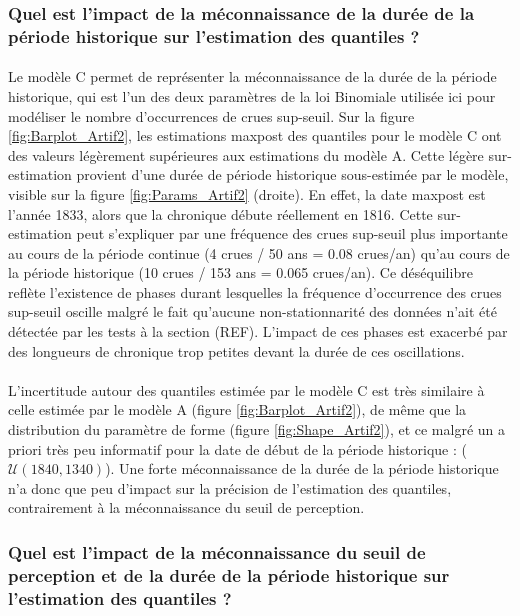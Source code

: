 \documentclass[11pt]{article}
\begin{document}
	\subsubsection{Quel est l'impact de la méconnaissance de la durée de la période historique sur l'estimation des quantiles ?}	
	
	\paragraph{} Le modèle C permet de représenter la méconnaissance de la durée de la période historique, qui est l'un des deux paramètres de la loi Binomiale utilisée ici pour modéliser le nombre d'occurrences de crues sup-seuil. Sur la figure \ref{fig:Barplot_Artif2}, les estimations maxpost des quantiles pour le modèle C ont des valeurs légèrement supérieures aux estimations du modèle A. Cette légère sur-estimation provient d'une durée de période historique sous-estimée par le modèle, visible sur la figure \ref{fig:Params_Artif2} (droite). En effet, la date maxpost est l'année 1833, alors que la chronique débute réellement en 1816. Cette sur-estimation peut s'expliquer par une fréquence des crues sup-seuil plus importante au cours de la période continue (4 crues / 50 ans = 0.08 crues/an) qu'au cours de la période historique (10 crues / 153 ans = 0.065 crues/an). Ce déséquilibre reflète l'existence de phases durant lesquelles la fréquence d'occurrence des crues sup-seuil oscille malgré le fait qu'aucune non-stationnarité des données n'ait été détectée par les tests à la section (REF). L'impact de ces phases est exacerbé par des longueurs de chronique trop petites devant la durée de ces oscillations. 
	\paragraph{} L'incertitude autour des quantiles estimée par le modèle C est très similaire à celle estimée par le modèle A (figure \ref{fig:Barplot_Artif2}), de même que la distribution du paramètre de forme (figure \ref{fig:Shape_Artif2}), et ce malgré un a priori très peu informatif pour la date de début de la période historique : ($\mathcal{U}(1840,1340)$). Une forte méconnaissance de la durée de la période historique n'a donc que peu d'impact sur la précision de l'estimation des quantiles, contrairement à la méconnaissance du seuil de perception.
	
	\subsubsection{Quel est l'impact de la méconnaissance du seuil de perception et de la durée de la période historique sur l'estimation des quantiles ?}	
	
\end{document}
